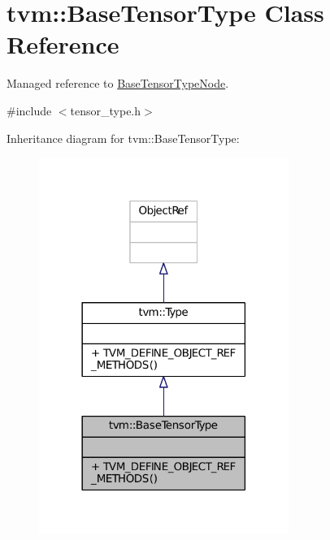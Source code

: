 \hypertarget{classtvm_1_1BaseTensorType}{}\section{tvm\+:\+:Base\+Tensor\+Type Class Reference}
\label{classtvm_1_1BaseTensorType}


Managed reference to \hyperlink{classtvm_1_1BaseTensorTypeNode}{Base\+Tensor\+Type\+Node}.  




{\ttfamily \#include $<$tensor\+\_\+type.\+h$>$}



Inheritance diagram for tvm\+:\+:Base\+Tensor\+Type\+:
\nopagebreak
\begin{figure}[H]
\begin{center}
\leavevmode
\includegraphics[width=230pt]{classtvm_1_1BaseTensorType__inherit__graph}
\end{center}
\end{figure}



